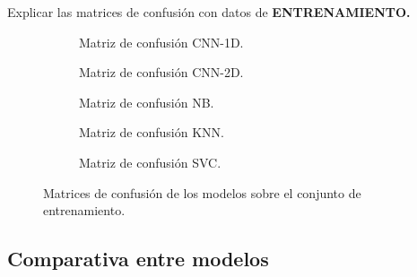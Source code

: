     Explicar las matrices de confusión con datos de \textbf{ENTRENAMIENTO.}

    \begin{figure}
        \centering
        \begin{subfigure}[b]{0.4\textwidth}
            \centering
            
            \caption{Matriz de confusión CNN-1D.}
            \label{ConfusionMatrixTrainImages:1D}
        \end{subfigure}
        \begin{subfigure}[b]{0.4\textwidth}
            \centering
            
            \caption{Matriz de confusión CNN-2D.} 
            \label{ConfusionMatrixTrainImages:2D}

        \end{subfigure}
        \begin{subfigure}[b]{0.4\textwidth}
            \centering
            
            \caption{Matriz de confusión NB.}
            \label{ConfusionMatrixTrainImages:NB}
        \end{subfigure}

        \begin{subfigure}[b]{0.4\textwidth}
            \centering
            
            \caption{Matriz de confusión KNN.}
            \label{ConfusionMatrixTrainImages:KNN}
        \end{subfigure}

        \begin{subfigure}[b]{0.4\textwidth}
            \centering
            
            \caption{Matriz de confusión SVC.}
            \label{ConfusionMatrixTrainImages:SVC}
        \end{subfigure}

        \caption{Matrices de confusión de los modelos sobre el conjunto de entrenamiento.}
        \label{ConfusionMatrixTrainImages}
     \end{figure}

  \subsection{Comparativa entre modelos}

